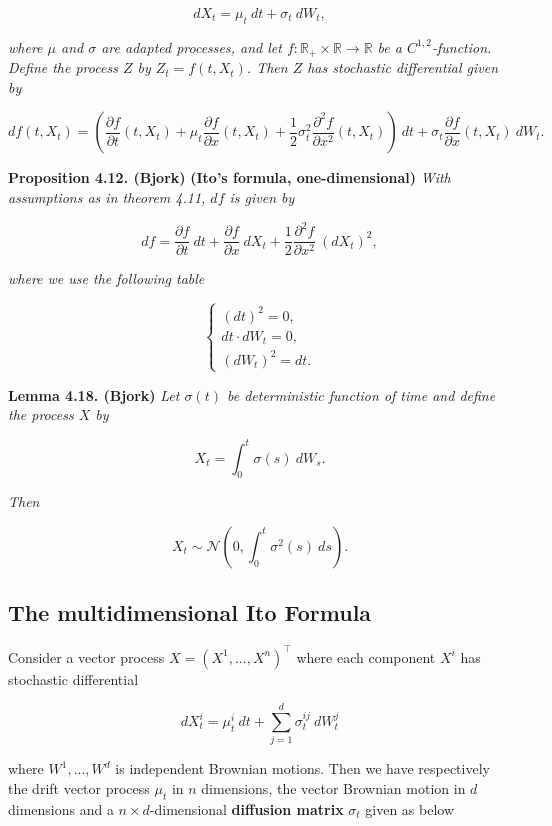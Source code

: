 \documentclass[a4paper,10pt,openany]{book}
\begin{document}
\[
dX_t=\mu_t\ dt + \sigma_t\ dW_t,\tag{4.28}
\]

\emph{where \(\mu\) and \(\sigma\) are adapted processes, and let \(f:\mathbb{R}_+\times\mathbb{R}\to\mathbb{R}\) be a \(C^{1,2}\)-function. Define the process \(Z\) by \(Z_t=f(t,X_t)\). Then \(Z\) has stochastic differential given by}

\[
df(t,X_t)=\left(\frac{\partial f}{\partial t}(t,X_t) + \mu_t\frac{\partial f}{\partial x}(t,X_t) + \frac{1}{2}\sigma^2_t\frac{\partial^2 f}{\partial x^2}(t,X_t)\right)\ dt+\sigma_t\frac{\partial f}{\partial x}(t,X_t)\ dW_t.\tag{4.29}
\]

\textbf{Proposition 4.12. (Bjork)} \textbf{(Ito's formula, one-dimensional)} \emph{With assumptions as in theorem 4.11, \(df\) is given by}

\[
df=\frac{\partial f}{\partial t}\ dt + \frac{\partial f}{\partial x}\ dX_t + \frac{1}{2}\frac{\partial^2 f}{\partial x^2}\ (dX_t)^2,\tag{4.31}
\]

\emph{where we use the following table}

\[
\left\{\begin{matrix}(dt)^2=0,\\ dt\cdot dW_t=0,\\ (dW_t)^2=dt.\end{matrix}\right.
\]

\textbf{Lemma 4.18. (Bjork)} \emph{Let \(\sigma(t)\) be deterministic function of time and define the process \(X\) by}

\[
X_t=\int_0^t \sigma(s)\ dW_s.\tag{4.37}
\]

\emph{Then}

\[
X_t\sim\mathcal{N}\left(0,\int_0^t\sigma^2(s)\ ds\right).
\]

\hypertarget{the-multidimensional-ito-formula}{%
\subsection{The multidimensional Ito Formula}\label{the-multidimensional-ito-formula}}

Consider a vector process \(X=(X^1,...,X^n)^\top\) where each component \(X^i\) has stochastic differential

\[
d X_t^i=\mu_t^i\ dt+\sum_{j=1}^d\sigma^{ij}_t\ dW_t^j
\]

where \(W^1,...,W^d\) is independent Brownian motions. Then we have respectively the drift vector process \(\mu_t\) in \(n\) dimensions, the vector Brownian motion in \(d\) dimensions and a \(n\times d\)-dimensional \textbf{diffusion matrix} \(\sigma_t\) given as below
\end{document}
